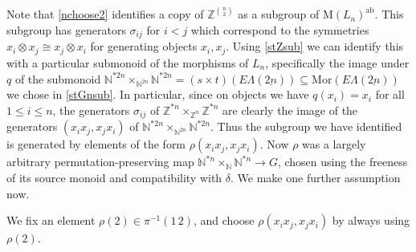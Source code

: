 \documentclass{amsbook} %
\newcommand{\ELnn}{E\Lambda(\underline{2n})}
\numberwithin{section}{chapter}
\begin{document}
\begin{rem}\label{which_nchoose2}
Note that \cref{nchoose2} identifies a copy of $\mathbb{Z}^{{n}\choose{2}}$ as a subgroup of $\mathrm{M}(L_n)^{\mathrm{ab}}$. This subgroup has generators $\sigma_{ij}$ for $i < j$ which correspond to the symmetries $x_i \otimes x_j \cong x_j \otimes x_i$ for generating objects $x_i, x_j$. Using \cref{stZsub} we can identify this with a particular submonoid of the morphisms of $L_n$, specifically the image under $q$ of the submonoid $\mathbb{N}^{\ast 2n} \times_{\mathbb{N}^{2n}} \mathbb{N}^{\ast 2n} = (s \times t)(\ELnn) \subseteq \mathrm{Mor}(\ELnn)$ we chose in \cref{stGnsub}. In particular, since on objects we have $q(x_i) = x_i$ for all $1 \le i \le n$, the generators $\sigma_{ij}$ of $\mathbb{Z}^{\ast n} \times_{\mathbb{Z}^n} \mathbb{Z}^{\ast n}$ are clearly the image of the generators $(x_ix_j, x_jx_i)$ of $\mathbb{N}^{\ast 2n} \times_{\mathbb{N}^{2n}} \mathbb{N}^{\ast 2n}$. Thus the subgroup we have identified is generated by elements of the form $\rho(x_ix_j, x_jx_i)$. Now $\rho$ was a largely arbitrary permutation-preserving map $\mathbb{N}^{\ast n} \times_{\mathbb{N}} \mathbb{N}^{\ast n} \to G$, chosen using the freeness of its source monoid and compatibility with $\delta$. We make one further assumption now.
\end{rem}

\begin{conv}\label{rho2}
We fix an element $\rho(2) \in \pi^{-1}(1\, 2)$, and choose $\rho(x_ix_j, x_jx_i)$ by always using $\rho(2)$.

\end{conv}
\end{document}
